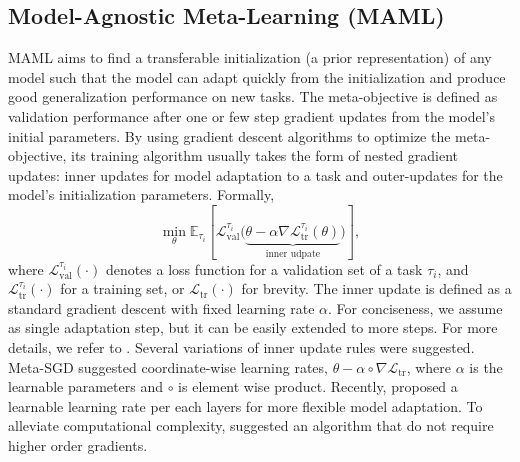 \documentclass{article}
\begin{document}
\vspace{-2mm}
\subsection{Model-Agnostic Meta-Learning (MAML)}
MAML aims to find a transferable initialization (a prior representation) of any model such that the model can adapt quickly from the initialization and produce good generalization performance on new tasks. The meta-objective is defined as validation performance after one or few step gradient updates from the model's initial parameters. By using gradient descent algorithms to optimize the meta-objective, its training algorithm usually takes the form of nested gradient updates: inner updates for model adaptation to a task and outer-updates for the model's initialization parameters. Formally, 
\begin{equation}
\label{eq:maml}
\min_\theta \mathbb{E}_{\tau_i}[\mathcal{L}_\textrm{val}^{\tau_i} \big( \underbrace{\theta - \alpha \nabla \mathcal{L}_{\textrm{tr}}^{\tau_i}(\theta)}_{\textrm{inner udpate}} \big)],
\end{equation}
where $\mathcal{L}_\textrm{val}^{\tau_i}(\cdot)$ denotes a loss function for a validation set of a task $\tau_i$, and $\mathcal{L}_\textrm{tr}^{\tau_i}(\cdot)$ for a training set, or $\mathcal{L}_\textrm{tr}(\cdot)$ for brevity. The inner update is defined as a standard gradient descent with fixed learning rate $\alpha$. For conciseness, we assume as single adaptation step, but it can be easily extended to more steps. For more details, we refer to \cite{Finn-icml-2017}. Several variations of inner update rules were suggested. Meta-SGD \cite{Li-arxiv-2017} suggested coordinate-wise learning rates, $\theta - \alpha \circ \nabla \mathcal{L}_\textrm{tr}$, where $\alpha$ is the learnable parameters and $\circ$ is element wise product. Recently, \cite{Antoniou-arxiv-2018} proposed a learnable learning rate per each layers for more flexible model adaptation. To alleviate computational complexity, \cite{Nichol-arxiv-2018} suggested an algorithm that do not require higher order gradients.
\end{document}
